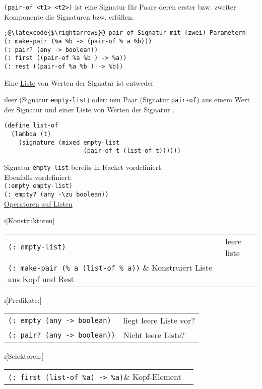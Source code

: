 \lstinline!(pair-of <t1> <t2>)! ist eine Signatur für Paare deren erster bzw. zweiter Komponente die Signaturen  bzw.  erfüllen.\\
\begin{lstlisting}
;@\latexcode{$\rightarrow$}@ pair-of Signatur mit (zwei) Parametern
(: make-pair (%a %b -> (pair-of % a %b)))
(: pair? (any -> boolean))
(: first ((pair-of %a %b ) -> %a))
(: rest ((pair-of %a %b ) -> %b))
\end{lstlisting}
Eine \underline{Liste} von Werten der Signatur  ist entweder
\begin{enumerate}[-]
\i leer (Signatur \lstinline!empty-list!) oder:
\i ein Paar (Signatur \lstinline!pair-of!) aus einem Wert der Signatur \argt{} und einer Liste von Werten der Signatur \argt{}. \\
\end{enumerate}
\begin{lstlisting}
(define list-of
  (lambda (t)
    (signature (mixed empty-list
                      (pair-of t (list-of t))))))

\end{lstlisting}
Signatur \lstinline!empty-list! bereits in Racket vordefiniert.\\
Ebenfalls vordefiniert:\\
\lstinline!(:empty empty-list)!\\
\lstinline!(: empty? (any -\zu boolean))!\\
\underline{Operatoren auf Listen}\\
\begin{enumerate}
\i[Konstruktoren]
\begin{tabular}{ll}
\lstinline!(: empty-list)!& leere liste\\
\lstinline!(: make-pair (% a (list-of % a))! & Konstruiert Liste aus Kopf und Rest
\end{tabular}
\i[Predikate:]
\begin{tabular}{ll}
\lstinline!(: empty (any -> boolean)!& liegt leere Liste vor?\\
\lstinline!(: pair? (any -> boolean))! & Nicht leere Liste?
\end{tabular}
\i[Selektoren:]
\begin{tabular}{ll}
\lstinline!(: first (list-of %a) -> %a)!& Kopf-Element\\
\lstinline!(: rest (list-of %a) -> (list-of %a))! & Rest Liste
\end{tabular}
\end{enumerate}
